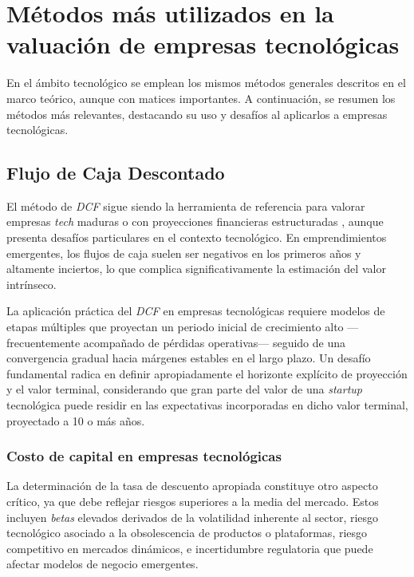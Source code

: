 \section{Métodos más utilizados en la valuación de empresas tecnológicas}

En el ámbito tecnológico se emplean los mismos métodos generales descritos en el marco teórico, aunque con matices importantes. A continuación, se resumen los métodos más relevantes, destacando su uso y desafíos al aplicarlos a empresas tecnológicas.

\subsection{Flujo de Caja Descontado}

El método de \emph{DCF} sigue siendo la herramienta de referencia para valorar empresas \emph{tech} maduras o con proyecciones financieras estructuradas \citep{kruze2023}, aunque presenta desafíos particulares en el contexto tecnológico. En emprendimientos emergentes, los flujos de caja suelen ser negativos en los primeros años y altamente inciertos, lo que complica significativamente la estimación del valor intrínseco.

La aplicación práctica del \emph{DCF} en empresas tecnológicas requiere modelos de etapas múltiples que proyectan un periodo inicial de crecimiento alto ---frecuentemente acompañado de pérdidas operativas--- seguido de una convergencia gradual hacia márgenes estables en el largo plazo. Un desafío fundamental radica en definir apropiadamente el horizonte explícito de proyección y el valor terminal, considerando que gran parte del valor de una \emph{startup} tecnológica puede residir en las expectativas incorporadas en dicho valor terminal, proyectado a 10 o más años.

\subsubsection{Costo de capital en empresas tecnológicas}

La determinación de la tasa de descuento apropiada constituye otro aspecto crítico, ya que debe reflejar riesgos superiores a la media del mercado. Estos incluyen \emph{betas} elevados derivados de la volatilidad inherente al sector, riesgo tecnológico asociado a la obsolescencia de productos o plataformas, riesgo competitivo en mercados dinámicos, e incertidumbre regulatoria que puede afectar modelos de negocio emergentes.

